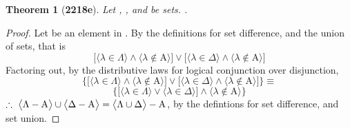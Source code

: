 \documentclass[preview]{standalone}
\newtheorem{theorem}{Theorem}
\begin{document}
\begin{theorem}[\textbf{2218e}]
    Let , \bm{$\Lambda$}, and \bm{$\Delta$} be sets. 
    .
\end{theorem}
\begin{proof} \color{black}
    Let \bm{$\lambda$} be an element in 
    .
    By the definitions for set difference, and the union of sets, that is
    \begin{equation*}
        \bigg[
            \Big \langle \lambda \in \Lambda \Big \rangle
                \land
            \Big \langle \lambda \notin \mathrm{A} \Big \rangle
        \bigg]
            \lor
        \bigg[
            \Big \langle \lambda \in \Delta \Big \rangle
                \land
            \Big \langle \lambda \notin \mathrm{A} \Big \rangle
        \bigg]
    \end{equation*}
    Factoring  out, 
    by the distributive laws for logical conjunction over disjunction,
    \begin{equation*}
        \Bigg\{
            \bigg[
                \Big \langle \lambda \in \Lambda \Big \rangle
                    \land
                \Big \langle \lambda \notin \mathrm{A} \Big \rangle
            \bigg]
                \lor
            \bigg[
                \Big \langle \lambda \in \Delta \Big \rangle
                    \land
                \Big \langle \lambda \notin \mathrm{A} \Big \rangle
            \bigg]
        \Bigg\}
            \equiv
    \end{equation*}
    \begin{equation*}
        \Bigg\{
            \bigg[
                \Big \langle \lambda \in \Lambda \Big \rangle
                    \lor
                \Big \langle \lambda \in \Delta \Big \rangle
            \bigg]
                \land
            \Big \langle \lambda \notin \mathrm{A} \Big \rangle
        \Bigg\}
    \end{equation*}
    $\therefore \text{\space} \relax{
    \big \langle \Lambda - \mathrm{A} \big \rangle 
        \cup 
    \big \langle \Delta - \mathrm{A} \big \rangle 
        = 
    \big \langle \Lambda \cup \Delta \big \rangle - \mathrm{A}
    }$,
    by the defintions for set difference, and set union.
\end{proof}
\end{document}
